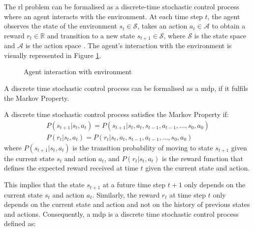 The \acrshort{rl} problem can be formalised as a discrete-time stochastic control process where an agent interacts with the environment. At each time step $t$, the agent observes the state of the environment $s_t \in \mathcal{S}$, takes an action $a_t \in \mathcal{A}$ to obtain a reward $r_t \in \mathbb{R}$ and transition to a new state $s_{t+1} \in \mathcal{S}$, where $\mathcal{S}$ is the state space and $\mathcal{A}$ is the action space \cite{Francois-Lavet2018}. The agent's interaction with the environment is visually represented in Figure \ref{fig:agent_environment_interaction}.

\begin{figure}[ht]
    \centering
    
    \caption{Agent interaction with environment}
    \label{fig:agent_environment_interaction}
\end{figure}

A discrete time stochastic control process can be formalised as a \acrfull{mdp}, if it fulfils the Markov Property. 

\begin{definition}
    A discrete time stochastic control process satisfies the Markov Property if:
    \begin{eqnarray}
        P(s_{t+1} | s_t, a_t) = P(s_{t+1} | s_t, a_t, s_{t-1}, a_{t-1}, \dots, s_0, a_0) \\  
        P(r_t | s_t, a_t) = P(r_t | s_t, a_t, s_{t-1}, a_{t-1}, \dots, s_0, a_0)
    \end{eqnarray}
    where $P(s_{t+1} | s_t, a_t)$ is the transition probability of moving to state $s_{t+1}$ given the current state $s_t$ and action $a_t$, and $P(r_t | s_t, a_t)$ is the reward function that defines the expected reward received at time $t$ given the current state and action.
\end{definition}

This implies that the state $s_{t+1}$ at a future time step $t+1$ only depends on the current state $s_t$ and action $a_t$. Similarly, the reward $r_t$ at time step $t$ only depends on the current state and action and not on the history of previous states and actions. Consequently, a \acrlong{mdp} \cite{Bellman1957} is a discrete time stochastic control process defined as:

